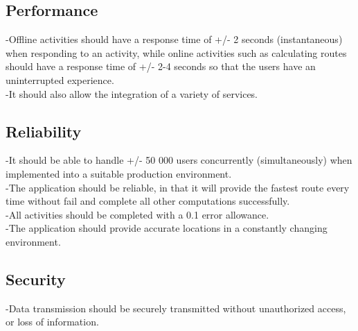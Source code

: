 

\subsection{Performance}
-Offline activities should have a response time of +/- 2 seconds (instantaneous) when responding to an activity, while online activities such as calculating routes should have a response time of +/- 2-4 seconds so that the users have an uninterrupted experience.\\
-It should also allow the integration of a variety of services.\\

\subsection{Reliability} 
-It should be able to handle +/- 50 000 users concurrently (simultaneously) when implemented into a suitable production environment. \\
-The application should be reliable, in that it will provide the fastest route every time without fail and complete all other computations successfully. \\
-All activities should be completed with a 0.1 error allowance.\\
-The application should provide accurate locations in a constantly changing environment.\\

\subsection{Security}
-Data transmission should be securely transmitted without unauthorized access, or loss of information.\\


